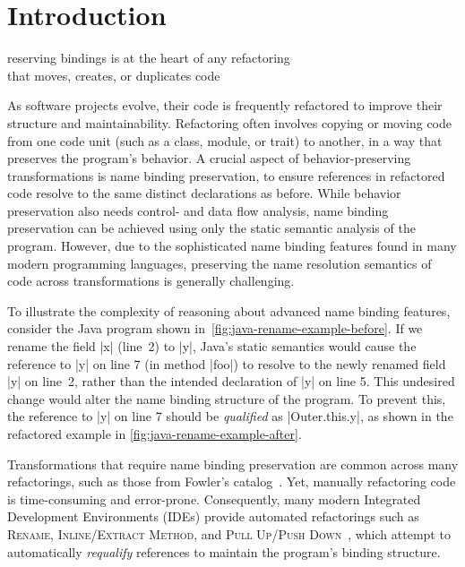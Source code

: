 \pagebreak[4]  %

\section{Introduction}%
\label{sec:introduction}

\begin{displayquote}
  reserving bindings is at the heart of any refactoring\\ that moves, creates, or duplicates code
\end{displayquote}

\noindent
As software projects evolve, their code is frequently refactored to improve their structure and maintainability.
Refactoring often involves copying or moving code from one code unit (such as a class, module, or trait) to another, in a way that preserves the program's behavior.
A crucial aspect of behavior-preserving transformations is name binding preservation, to ensure references in refactored code resolve to the same distinct declarations as before.
While behavior preservation also needs control- and data flow analysis, name binding preservation can be achieved using only the static semantic analysis of the program.
However, due to the sophisticated name binding features found in many modern programming languages, preserving the name resolution semantics of code across transformations is generally challenging.

To illustrate the complexity of reasoning about advanced name binding features, consider the Java program shown in~\cref{fig:java-rename-example-before}.
If we rename the field \Java|x| (line~2) to \Java|y|, Java's static semantics would cause the reference to \Java|y| on line 7 (in method \Java|foo|) to resolve to the newly renamed field \Java|y| on line~2, rather than the intended declaration of \Java|y| on line 5.
This undesired change would alter the name binding structure of the program.
To prevent this, the reference to \Java|y| on line 7 should be \emph{qualified} as \Java|Outer.this.y|, as shown in the refactored example in \cref{fig:java-rename-example-after}.

Transformations that require name binding preservation are common across many refactorings, such as those from Fowler's catalog~\cite{Fowler99}.
Yet, manually refactoring code is time-consuming and error-prone.
Consequently, many modern Integrated Development Environments (IDEs) provide automated refactorings such as \textsc{Rename}, \textsc{Inline/Extract Method}, and \textsc{Pull Up/Push Down}~\cite{Fowler99}, which attempt to automatically \emph{requalify} references to maintain the program's binding structure.

